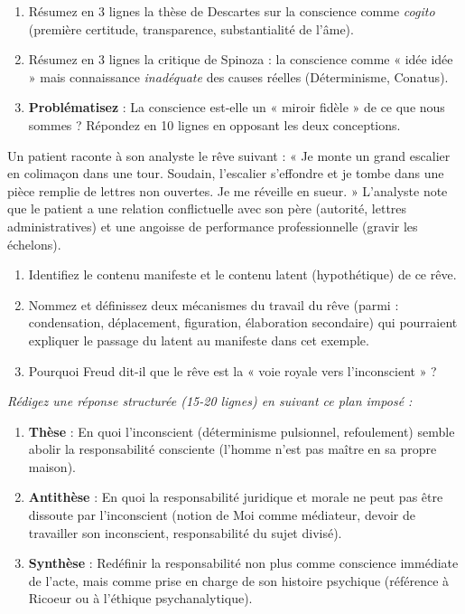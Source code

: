 \documentclass[11pt]{article}
\newcommand{\cle}[1]{{\popxbold\color{popdark}#1}}
\begin{document}
\begin{exercice}
\begin{enumerate}
\item Résumez en 3 lignes la thèse de Descartes sur la conscience comme \emph{cogito} (première certitude, transparence, substantialité de l'âme).
\item Résumez en 3 lignes la critique de Spinoza : la conscience comme « idée idée » mais connaissance \emph{inadéquate} des causes réelles (Déterminisme, Conatus).
\item \textbf{Problématisez} : La conscience est-elle un « miroir fidèle » de ce que nous sommes ? Répondez en 10 lignes en opposant les deux conceptions.
\end{enumerate}
\end{exercice}

\begin{exercice}
Un patient raconte à son analyste le rêve suivant : « Je monte un grand escalier en colimaçon dans une tour. Soudain, l'escalier s'effondre et je tombe dans une pièce remplie de lettres non ouvertes. Je me réveille en sueur. » L'analyste note que le patient a une relation conflictuelle avec son père (autorité, lettres administratives) et une angoisse de performance professionnelle (gravir les échelons).
\begin{enumerate}
\item Identifiez le \cle{contenu manifeste} et le \cle{contenu latent} (hypothétique) de ce rêve.
\item Nommez et définissez deux \cle{mécanismes du travail du rêve} (parmi : condensation, déplacement, figuration, élaboration secondaire) qui pourraient expliquer le passage du latent au manifeste dans cet exemple.
\item Pourquoi Freud dit-il que le rêve est la « voie royale vers l'inconscient » ?
\end{enumerate}
\end{exercice}

\begin{exercice}
\emph{Rédigez une réponse structurée (15-20 lignes) en suivant ce plan imposé :}
\begin{enumerate}
\item \textbf{Thèse} : En quoi l'inconscient (déterminisme pulsionnel, refoulement) semble abolir la responsabilité consciente (l'homme n'est pas maître en sa propre maison).
\item \textbf{Antithèse} : En quoi la responsabilité juridique et morale ne peut pas être dissoute par l'inconscient (notion de \cle{Moi} comme médiateur, devoir de \cle{travailler} son inconscient, responsabilité du sujet divisé).
\item \textbf{Synthèse} : Redéfinir la responsabilité non plus comme conscience immédiate de l'acte, mais comme \cle{prise en charge} de son histoire psychique (référence à Ricoeur ou à l'éthique psychanalytique).
\end{enumerate}
\end{exercice}
\end{document}
